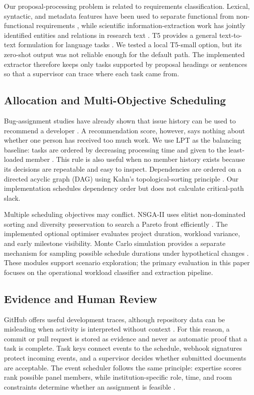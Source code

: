 \documentclass[conference]{IEEEtran}
\begin{document}
Our proposal-processing problem is related to requirements classification. Lexical, syntactic, and metadata features have been used to separate functional from non-functional requirements \cite{kurtanovic2017requirements}, while scientific information-extraction work has jointly identified entities and relations in research text \cite{luan2018sciie}. T5 provides a general text-to-text formulation for language tasks \cite{raffel2020t5}. We tested a local T5-small option, but its zero-shot output was not reliable enough for the default path. The implemented extractor therefore keeps only tasks supported by proposal headings or sentences so that a supervisor can trace where each task came from.

\subsection{Allocation and Multi-Objective Scheduling}
Bug-assignment studies have already shown that issue history can be used to recommend a developer \cite{anvik2006bug}. A recommendation score, however, says nothing about whether one person has received too much work. We use LPT as the balancing baseline: tasks are ordered by decreasing processing time and given to the least-loaded member \cite{graham1969bounds}. This rule is also useful when no member history exists because its decisions are repeatable and easy to inspect. Dependencies are ordered on a directed acyclic graph (DAG) using Kahn's topological-sorting principle \cite{kahn1962topological}. Our implementation schedules dependency order but does not calculate critical-path slack.

Multiple scheduling objectives may conflict. NSGA-II uses elitist non-dominated sorting and diversity preservation to search a Pareto front efficiently \cite{deb2002nsga2}. The implemented optional optimiser evaluates project duration, workload variance, and early milestone visibility. Monte Carlo simulation provides a separate mechanism for sampling possible schedule durations under hypothetical changes \cite{metropolis1949montecarlo}. These modules support scenario exploration; the primary evaluation in this paper focuses on the operational workload classifier and extraction pipeline.

\subsection{Evidence and Human Review}
GitHub offers useful development traces, although repository data can be misleading when activity is interpreted without context \cite{kalliamvakou2014github}. For this reason, a commit or pull request is stored as evidence and never as automatic proof that a task is complete. Task keys connect events to the schedule, webhook signatures protect incoming events, and a supervisor decides whether submitted documents are acceptable. The event scheduler follows the same principle: expertise scores rank possible panel members, while institution-specific role, time, and room constraints determine whether an assignment is feasible \cite{schaerf1999timetabling}.
\end{document}
